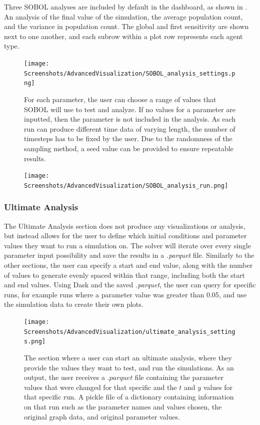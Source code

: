 Three SOBOL analyses are included by default in the dashboard, as shown in . 
An analysis of the final value of the simulation, the average population count, and the variance in population count. 
The global and first sensitivity are shown next to one another, and each subrow within a plot row represents each agent type. 
\begin{figure}
    \centering
    \texttt{[image: Screenshots/AdvancedVisualization/SOBOL\_analysis\_settings.png]}
    \caption{
		For each parameter, the user can choose a range of values that SOBOL will use to test and analyze. 
		If no values for a parameter are inputted, then the parameter is not included in the analysis. 
        As each run can produce different time data of varying length, the number of timesteps has to be fixed by the user. 
        Due to the randomness of the sampling method, a seed value can be provided to ensure repeatable results. 
    }
    \label{fig:ss:av:SOBOL_analysis_settings}
\end{figure}
\begin{figure}
    \centering
    \texttt{[image: Screenshots/AdvancedVisualization/SOBOL\_analysis\_run.png]}
    \caption{
    }
    \label{fig:ss:av:SOBOL_analysis_run}
\end{figure}

\subsubsection{Ultimate Analysis}
The Ultimate Analysis section does not produce any visualizations or analysis, but instead allows for the user to define which initial conditions and parameter values they want to run a simulation on. 
The solver will iterate over every single parameter input possibility and save the results in a \textit{.parquet} file. 
Similarly to the other sections, the user can specify a start and end value, along with the number of values to generate evenly spaced within that range, including both the start and end values. 
\newline 
Using Dask and the saved \textit{.parquet}, the user can query for specific runs, for example runs where a parameter value was greater than 0.05, and use the simulation data to create their own plots. 
\begin{figure}
    \centering
    \texttt{[image: Screenshots/AdvancedVisualization/ultimate\_analysis\_settings.png]}
    \caption{
        The section where a user can start an ultimate analysis, where they provide the values they want to test, and run the simulations. 
        As an output, the user receives a $.parquet$ file containing the parameter values that were changed for that specific and the $t$ and $y$ values for that specific run. 
        A pickle file of a dictionary containing information on that run such as the parameter names and values chosen, the original graph data, and original parameter values. 
    }
    \label{fig:ss:av:ultimate_analysis_settings}
\end{figure}

